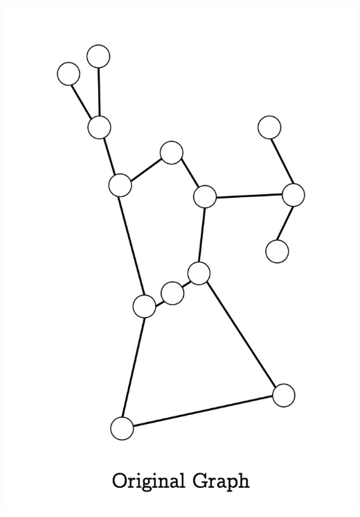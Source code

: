 \documentclass[unknownkeysallowed]{beamer}
\begin{document}
\begin{frame}
\centering\includegraphics[height=0.9\textheight]{assets/eg-cutvertex/0}
\end{frame}

\end{document}
